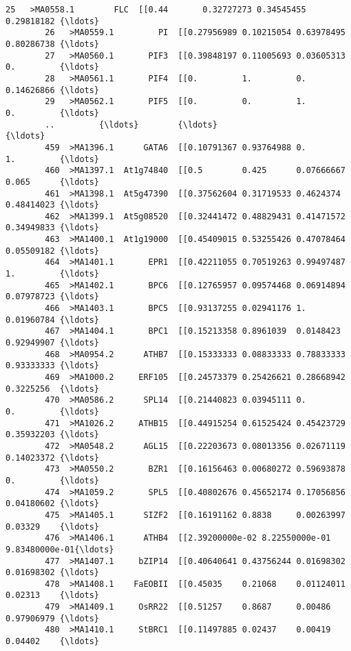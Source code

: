 \documentclass[11pt]{article}
\begin{document}
\begin{Verbatim}[commandchars=\\\{\}]
        25   >MA0558.1        FLC  [[0.44       0.32727273 0.34545455 0.29818182 {\ldots}   
        26   >MA0559.1         PI  [[0.27956989 0.10215054 0.63978495 0.80286738 {\ldots}   
        27   >MA0560.1       PIF3  [[0.39848197 0.11005693 0.03605313 0.         {\ldots}   
        28   >MA0561.1       PIF4  [[0.         1.         0.         0.14626866 {\ldots}   
        29   >MA0562.1       PIF5  [[0.         0.         1.         0.         {\ldots}   
        ..         {\ldots}        {\ldots}                                                {\ldots}   
        459  >MA1396.1      GATA6  [[0.10791367 0.93764988 0.         1.         {\ldots}   
        460  >MA1397.1  At1g74840  [[0.5        0.425      0.07666667 0.065      {\ldots}   
        461  >MA1398.1  At5g47390  [[0.37562604 0.31719533 0.4624374  0.48414023 {\ldots}   
        462  >MA1399.1  At5g08520  [[0.32441472 0.48829431 0.41471572 0.34949833 {\ldots}   
        463  >MA1400.1  At1g19000  [[0.45409015 0.53255426 0.47078464 0.05509182 {\ldots}   
        464  >MA1401.1       EPR1  [[0.42211055 0.70519263 0.99497487 1.         {\ldots}   
        465  >MA1402.1       BPC6  [[0.12765957 0.09574468 0.06914894 0.07978723 {\ldots}   
        466  >MA1403.1       BPC5  [[0.93137255 0.02941176 1.         0.01960784 {\ldots}   
        467  >MA1404.1       BPC1  [[0.15213358 0.8961039  0.0148423  0.92949907 {\ldots}   
        468  >MA0954.2      ATHB7  [[0.15333333 0.08833333 0.78833333 0.93333333 {\ldots}   
        469  >MA1000.2     ERF105  [[0.24573379 0.25426621 0.28668942 0.3225256  {\ldots}   
        470  >MA0586.2      SPL14  [[0.21440823 0.03945111 0.         0.         {\ldots}   
        471  >MA1026.2     ATHB15  [[0.44915254 0.61525424 0.45423729 0.35932203 {\ldots}   
        472  >MA0548.2      AGL15  [[0.22203673 0.08013356 0.02671119 0.14023372 {\ldots}   
        473  >MA0550.2       BZR1  [[0.16156463 0.00680272 0.59693878 0.         {\ldots}   
        474  >MA1059.2       SPL5  [[0.40802676 0.45652174 0.17056856 0.04180602 {\ldots}   
        475  >MA1405.1      SIZF2  [[0.16191162 0.8838     0.00263997 0.03329    {\ldots}   
        476  >MA1406.1      ATHB4  [[2.39200000e-02 8.22550000e-01 9.83480000e-01{\ldots}   
        477  >MA1407.1     bZIP14  [[0.40640641 0.43756244 0.01698302 0.01698302 {\ldots}   
        478  >MA1408.1    FaEOBII  [[0.45035    0.21068    0.01124011 0.02313    {\ldots}   
        479  >MA1409.1     OsRR22  [[0.51257    0.8687     0.00486    0.97906979 {\ldots}   
        480  >MA1410.1     StBRC1  [[0.11497885 0.02437    0.00419    0.04402    {\ldots}   

\end{Verbatim}
\end{document}

